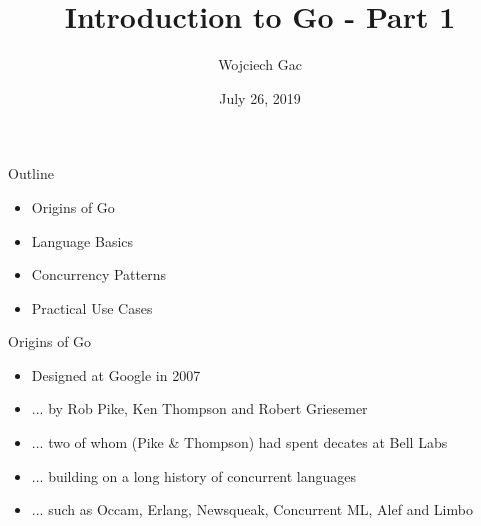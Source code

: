 \documentclass[pdf,xcolor=dvipsnames,noparindent]{beamer}
\title{Introduction to Go - Part 1}
\author{Wojciech Gac}
\date{July 26, 2019}
\begin{document}
\begin{frame}
	\titlepage
\end{frame}


	  

\begin{frame}{Outline}
  \pause
  \begin{itemize}
  \item Origins of Go
    \pause
  \item Language Basics
    \pause
  \item Concurrency Patterns
    \pause
  \item Practical Use Cases
    \pause
  \end{itemize}
\end{frame}

\begin{frame}{Origins of Go}
  \pause
  \begin{itemize}
  \item Designed at Google in 2007
    \pause
  \item ... by Rob Pike, Ken Thompson and Robert Griesemer
    \pause
  \item ... two of whom (Pike \& Thompson) had spent decates at Bell Labs
    \pause
  \item ... building on a long history of concurrent languages
    \pause
  \item ... such as Occam, Erlang, Newsqueak, Concurrent ML, Alef and Limbo
  \end{itemize}
  
\end{frame}
\end{document}
